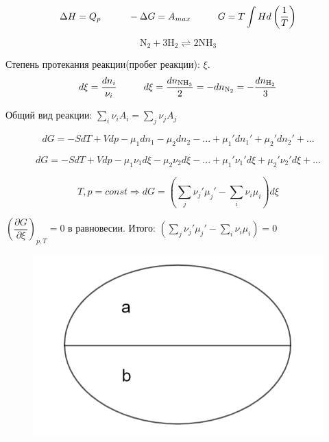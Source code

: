 \begin{lecture}
\begin{lecSection}
	\begin{equation}	
	\begin{aligned}
	\Delta H = Q_p \hspace*{1cm} -\Delta G = A_{max} \hspace*{1cm} G = T \int H d \left( \frac{1}{T}\right)
	\end{aligned}
	\end{equation}
	
	\end{lecSection}

	\begin{lecSection}[Пример]

	\begin{equation}
	\mathrm{N_2 + 3H_2 \rightleftharpoons  2NH_3}
	\end{equation}
	
	Степень протекания реакции(пробег реакции): $\xi$.
	\begin{equation}	
	\begin{aligned}
	d \xi = \frac{dn_i}{\nu_i} \hspace*{1cm} d\xi = \frac{dn_{\mathrm{NH_3}}}{2} = -dn_{\mathrm{N_2}} = -\frac{dn_{\mathrm{H_2}}}{3}
	\end{aligned}
	\end{equation}	
	
	Общий вид реакции: $\sum\limits_{i} \nu_i A_i = \sum\limits_{j} \nu_j A_j$
	
	\begin{equation}
	dG = -SdT + Vdp - \mu_1dn_1 - \mu_2dn_2 - ... + \mu_1'dn_1' + \mu_2'dn_2' + ...  
	\end{equation}
	
	\begin{equation}
	dG = -SdT + Vdp - \mu_1\nu_1d\xi - \mu_2\nu_2d\xi - ... + \mu_1'\nu_1'd\xi + \mu_2'\nu_2'd\xi + ...
	\end{equation}
	
	\begin{equation}
	T,p = const \Rightarrow dG = (\sum\limits_{j} \nu_j'\mu_j' - \sum\limits_{i} \nu_i\mu_i) d \xi
	\end{equation}
	\par $\left( \dfrac{\partial G}{\partial \xi} \right)_{p,T} = 0$ в равновесии. Итого: $(\sum\limits_{j} \nu_j'\mu_j' - \sum\limits_{i} \nu_i\mu_i) = 0$
	\begin{figure}
		\includegraphics[width=\linewidth]{lecture_02/pic2}
	\end{figure}
	

\end{lecSection}
\end{lecture}

